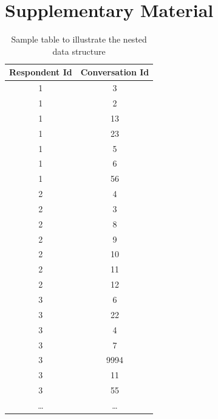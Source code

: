 \documentclass{article}
\begin{document}
\newpage



\clearpage
\section{Supplementary Material}

\begin{table}[htbp]
    \centering
    \begin{tabular}{|c|c|}
    \hline
    \textbf{Respondent Id} & \textbf{Conversation Id} \\
    \hline
    1 & 3 \\
    1 & 2 \\
    1 & 13 \\
    1 & 23 \\
    1 & 5 \\
    1 & 6 \\
    1 & 56 \\
    \midrule
    2 & 4 \\
    2 & 3 \\
    2 & 8 \\
    2 & 9 \\
    2 & 10 \\
    2 & 11 \\
    2 & 12 \\
    \midrule
    3 & 6 \\
    3 & 22 \\
    3 & 4 \\
    3 & 7 \\
    3 & 9994 \\
    3 & 11 \\
    3 & 55 \\
    \dots & \dots \\
    \hline
    \end{tabular}
    \caption{Sample table to illustrate the nested data structure}
    \label{sample-table}
\end{table}

\clearpage

\end{document}
